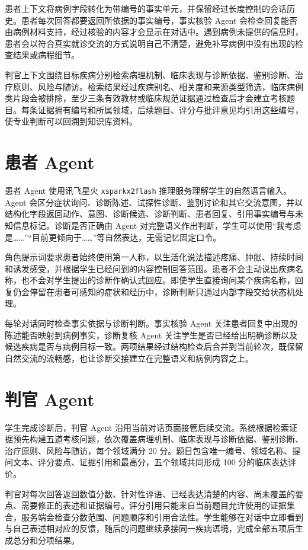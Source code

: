 患者上下文将病例字段转化为带编号的事实单元，并保留经过长度控制的会话历史。患者每次回答都要返回所依据的事实编号，事实核验 Agent 会检查回复能否由病例材料支持，经过核验的内容才会显示在对话中。遇到病例未提供的信息时，患者会以符合真实就诊交流的方式说明自己不清楚，避免补写病例中没有出现的检查结果或病程细节。

判官上下文围绕目标疾病分别检索病理机制、临床表现与诊断依据、鉴别诊断、治疗原则、风险与随访。检索结果经过疾病别名、相关度和来源类型筛选，临床病例类片段会被排除，至少三条有效教材或临床规范证据通过检查后才会建立考核题目。每条证据拥有编号和所属领域，后续题目、评分与批评意见均引用这些编号，使专业判断可以回溯到知识库资料。

\section{患者 Agent}

患者 Agent 使用讯飞星火 \texttt{xsparkx2flash} 推理服务理解学生的自然语言输入。Agent 会区分症状询问、诊断陈述、试探性诊断、鉴别讨论和其它交流意图，并以结构化字段返回动作、意图、诊断候选、诊断判断、患者回复、引用事实编号与未知信息标记。诊断是否正确由 Agent 对完整语义作出判断，学生可以使用“我考虑是……”“目前更倾向于……”等自然表达，无需记忆固定口令。

角色提示词要求患者始终使用第一人称，以生活化说法描述疼痛、肿胀、持续时间和诱发感受，并根据学生已经问到的内容控制回答范围。患者不会主动说出疾病名称，也不会对学生提出的诊断作确认式回应。即使学生直接询问某个疾病名称，回复仍会停留在患者可感知的症状和经历中，诊断判断只通过内部字段交给状态机处理。

每轮对话同时检查事实依据与诊断判断。事实核验 Agent 关注患者回复中出现的陈述能否映射到病例事实，诊断复核 Agent 关注学生是否已经给出明确诊断以及候选疾病是否与病例目标一致。两项结果经过结构检查后合并到当前轮次，既保留自然交流的流畅感，也让诊断交接建立在完整语义和病例内容之上。

\section{判官 Agent}

学生完成诊断后，判官 Agent 沿用当前对话页面接管后续交流。系统根据检索证据预先构建五道考核问题，依次覆盖病理机制、临床表现与诊断依据、鉴别诊断、治疗原则、风险与随访，每个领域满分 20 分。题目包含唯一编号、领域名称、提问文本、评分要点、证据引用和最高分，五个领域共同形成 100 分的临床表达评价。

判官对每次回答返回数值分数、针对性评语、已经表达清楚的内容、尚未覆盖的要点、需要修正的表述和证据编号。评分引用只能来自当前题目允许使用的证据集合，服务端会检查分数范围、问题顺序和引用合法性。学生能够在对话中立即看到与自己表述相对应的反馈，随后的问题继续承接同一疾病语境，完成全部五项后生成总分和分项结果。

